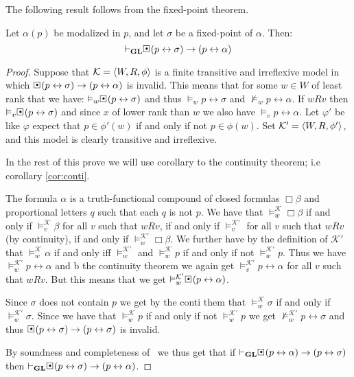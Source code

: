 \documentclass[../main.tex]{subfiles}
\begin{document}
The following result follows from the fixed-point theorem.
\begin{thm}\label{thm:exi}
	Let $\alpha(p)$ be modalized in $p$, and let $\sigma$ be a fixed-point
	of $\alpha$. Then:
	\[\vdash_\GL\sBox(p\leftrightarrow\sigma)\rightarrow(p\leftrightarrow\alpha)\]
\end{thm}
\begin{proof}
	Suppose that $\mathcal{K}=\langle W,R,\phi\rangle$ is a finite transitive and irreflexive model
	in which
	$\sBox(p\leftrightarrow\sigma)\rightarrow(p\leftrightarrow\alpha)$ is
	invalid. This means that for some $w\in W$ of least rank that we have:
	$\vDash_w\sBox(p\leftrightarrow\sigma)$ and thus $\vDash_w
	p\leftrightarrow\sigma$ and $\not\vDash_w p\leftrightarrow\alpha$. If $wRv$
	then $\vDash_v\sBox(p\leftrightarrow\sigma)$ and since $x$ of lower
	rank than $w$ we also have $\vDash_v p\leftrightarrow\alpha$. Let
	$\varphi'$ be like $\varphi$ expect that $p\in\phi'(w)$ if and only if
	not $p\in\phi(w)$. Set $\mathcal{K}'=\langle W,R,\phi'\rangle$, and this model
	is clearly transitive and irreflexive.

	In the rest of this prove we will use corollary to the continuity
	theorem; i.e corollary \ref{cor:conti}.


	The formula $\alpha$ is a truth-functional compound  of closed formulas $\Box\beta$ and proportional letters $q$
	such that each $q$ is not $p$. We have that
	$\vDash_w^\mathcal{K}\Box\beta$ if and only if
	$\vDash_v^\mathcal{K}\beta$ for all $v$ such that $wRv$, if and only if
	$\vDash_v^{\mathcal{K}'}$ for all $v$ such that $wRv$ (by continuity),
	if and only if $\vDash_w^{\mathcal{K}'}\Box\beta$. We further have by
	the definition of $\mathcal{K}'$ that $\vDash_w^\mathcal{K}\alpha$ if
	and only iff $\vDash_w^{\mathcal{K}'}$ and $\vDash_w^\mathcal{K}p$ if
	and only if not $\vDash_w^{\mathcal{K}'}p$. Thus we have
	$\vDash_w^{\mathcal{K}'}p\leftrightarrow\alpha$ and b the continuity  theorem
	we again get $\vDash_v^{\mathcal{K}'}p\leftrightarrow\alpha$ for all
	$v$ such that $wRv$. But this means that we get
	$\vDash_w^{\mathcal{K}'}\sBox(p\leftrightarrow\alpha)$.
	
	Since $\sigma$ does not contain $p$ we get by the conti them that
	$\vDash_w^\mathcal{K}\sigma$ if and only if
	$\vDash_w^{\mathcal{K}'}\sigma$. Since we have that
	$\vDash_w^\mathcal{K} p$ if and only if not $\vDash_w^{\mathcal{K}'}p$
	we get $\not\vDash_w^{\mathcal{K}'}p\leftrightarrow \sigma$ and thus
	$\sBox(p\leftrightarrow\sigma)\rightarrow(p\leftrightarrow\sigma)$ is
	invalid.

	By soundness and completeness of \GL\ we thus get that if
	$\vdash_\GL\sBox(p\leftrightarrow\alpha)\rightarrow(p\leftrightarrow\sigma)$
	then
	$\vdash_\GL\sBox(p\leftrightarrow\sigma)\rightarrow(p\leftrightarrow\alpha)$.
\end{proof}
\end{document}
